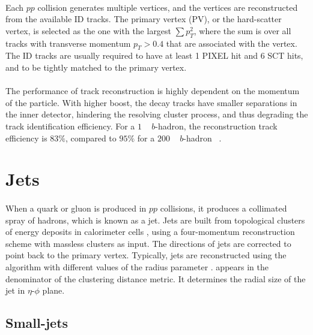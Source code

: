 \paragraph{}
Each $pp$ collision generates multiple vertices, and the vertices are reconstructed from the available ID tracks. 
The primary vertex (PV), or the hard-scatter vertex, is selected as the one with the largest $\sum p_T^2$, where the sum is over all tracks with transverse momentum $p_T > 0.4$ \GeV that are associated with the vertex.
The ID tracks are usually required to have at least 1 PIXEL hit and 6 SCT hits, and to be tightly matched to the primary vertex. 

\paragraph{}
The performance of track reconstruction is highly dependent on the momentum of the particle. 
With higher boost, the decay tracks have smaller separations in the inner detector, hindering the resolving cluster process, and thus degrading the track identification efficiency. 
For a $1$ \TeV~ $b$-hadron, the reconstruction track efficiency is $83\%$, compared to $95\%$ for a $200$ \GeV~ $b$-hadron ~\cite{Aaboud:2017all}.

\section{Jets}
\paragraph{}
When a quark or gluon is produced in $pp$ collisions, it produces a collimated spray of hadrons, which is known as a jet. 
Jets are built from topological clusters of energy deposits in calorimeter cells \cite{PERF-2014-07}, using a four-momentum reconstruction scheme with massless clusters as input. 
The directions of jets are corrected to point back to the primary vertex.
Typically, jets are reconstructed using the \akt algorithm with different values of the radius parameter \R. 
\R appears in the denominator of the clustering distance metric. 
It determines the radial size of the jet in $\eta$-$\phi$ plane.

\subsection{Small-\R jets}
